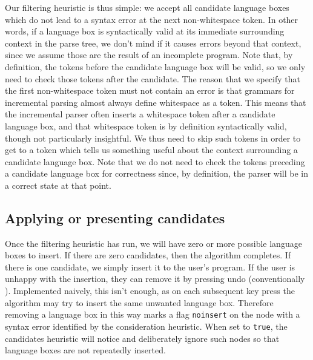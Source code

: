 \documentclass[sigplan,screen]{acmart}\settopmatter{printfolios=true,printccs=false,printacmref=false}
\begin{document}
Our filtering heuristic is thus simple: we accept all candidate language
boxes which do not lead to a syntax error at the next non-whitespace token. In other
words, if a language box is syntactically valid at its immediate surrounding
context in the parse tree, we don't mind if it causes errors beyond that
context, since we assume those are the result of an
incomplete program. Note that, by definition, the tokens before the candidate
language box will be valid, so we only need to check those tokens after the
candidate. The reason that we specify that the first non-whitespace
token must not contain an error is that grammars for incremental parsing almost
always define whitespace as a token. This means that the incremental parser
often inserts a whitespace token after a candidate language box, and that
whitespace token is by definition syntactically valid, though not particularly
insightful. We thus need to skip such tokens in order to get to a
token which tells us something useful about the context surrounding a candidate
language box.
Note that we do not need to check the tokens preceding a candidate language box
for correctness since, by definition, the parser will be in a correct state
at that point.


\subsection{Applying or presenting candidates}
\label{applying and presenting}

Once the filtering heuristic has run, we will have zero or more possible
language boxes to insert. If there are zero candidates, then the algorithm
completes. If there is one candidate, we simply insert it to the user's
program. If the user is unhappy with the insertion, they can remove it by
pressing undo (conventionally ). Implemented naively, this isn't
enough, as on each subsequent key press the algorithm may try to insert the
same unwanted language box. Therefore removing a language box in this way marks
a flag \texttt{noinsert} on the node with a syntax error identified by the
consideration heuristic. When set to \texttt{true}, the candidates heuristic
will notice and deliberately ignore such nodes so that language boxes are not
repeatedly inserted.
\end{document}
